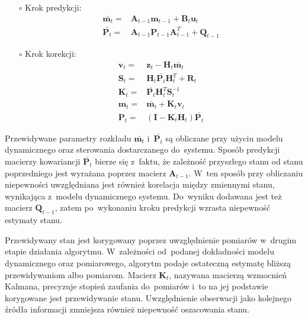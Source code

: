 \begin{itemize}
	\item[$\circ$] Krok predykcji:
	\begin{align}\label{eq:KalmanPredictionStep}
	\bar{\boldsymbol{m}_{t}} =& \mathbf{A}_{t-1}\boldsymbol{m}_{t-1} + \mathbf{B}_t\boldsymbol{u}_{t} \nonumber \\
	\bar{\mathbf{P}_{t}} =& \mathbf{A}_{t-1} \mathbf{P}_{t-1} \mathbf{A}_{t-1}^T + \mathbf{Q}_{t-1}
	\end{align}
	\item[$\circ$] Krok korekcji:
	\begin{align}\label{eq:KalmanCorrectionStep}
	\mathbf{v}_t=&\mathbf{z}_t-\mathbf{H}_t \bar{\mathbf{m}_{t}} \nonumber \\
	\mathbf{S}_t=&\mathbf{H}_t \bar{\mathbf{P}_{t}} \mathbf{H}_t^T + \mathbf{R}_t \nonumber \\
	\mathbf{K}_t=&\bar{\mathbf{P}_{t}} \mathbf{H}_t^T \mathbf{S}_t^{-1}\nonumber \\
	\mathbf{m}_{t}=&\bar{\mathbf{m}_{t}} + \mathbf{K}_t \mathbf{v}_t\nonumber \\
	\mathbf{P}_{t}=&(\mathbf{I} - \mathbf{K}_t \mathbf{H}_t) \bar{\mathbf{P}_{t}}
	\end{align}
\end{itemize}
\par
Przewidywane parametry rozkładu $\bar{\boldsymbol{m}_{t}}$ i~$\bar{\mathbf{P}_{t}}$ są obliczane przy użyciu modelu dynamicznego oraz sterowania dostarczanego do~systemu. Sposób predykcji macierzy kowariancji $\bar{\mathbf{P}_{t}}$ bierze się z~faktu, że zależność przyszłego stanu od stanu poprzedniego jest wyrażana poprzez macierz $\mathbf{A}_{t-1}$. W~ten sposób przy obliczaniu niepewności uwzględniana jest również korelacja między zmiennymi stanu, wynikająca z~modelu dynamicznego systemu. Do~wyniku dodawana jest też macierz $\mathbf{Q}_{t-1}$, zatem po~wykonaniu kroku predykcji wzrasta niepewność estymaty stanu.
\par
Przewidywany stan jest korygowany poprzez uwzględnienie pomiarów w~drugim etapie działania algorytmu. W~zależności od~podanej dokładności modelu dynamicznego oraz pomiarowego, algorytm podaje ostateczną estymatę bliższą przewidywaniom albo pomiarom. Macierz $\mathbf{K}_t$, nazywana macierzą wzmocnień Kalmana, precyzuje stopień zaufania do~pomiarów i~to na jej podstawie korygowane jest przewidywanie stanu. Uwzględnienie obserwacji jako kolejnego źródła informacji zmniejsza również niepewność oszacowania stanu.
